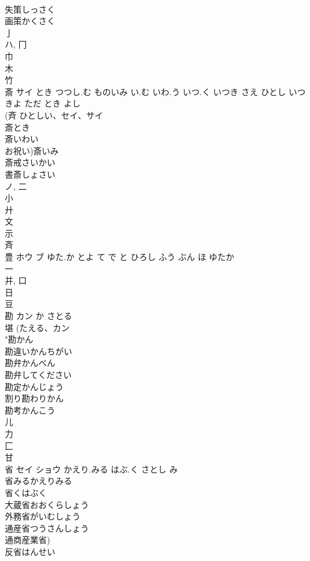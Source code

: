 \documentclass[8pt]{extreport}
\begin{document}
\begin{CJK}{UTF8}{min}
\\	失策しっさく 
\\	画策かくさく 
\\	亅 
\\	ハ, 冂 
\\	巾 
\\	木 
\\	竹 
\\	斎	サイ	とき つつし.む ものいみ い.む いわ.う いつ.く いつき さえ ひとし いつ きよ ただ とき よし	
\\	(斉 ひとしい、セイ、サイ 
\\	斎とき
\\	斎いわい
\\	お祝い)斎いみ
\\	斎戒さいかい
\\	書斎しょさい
\\	ノ, 二 
\\	小 
\\	廾 
\\	文 
\\	示 
\\	斉 
\\	豊	ホウ ブ	ゆた.か とよ て で と ひろし ふう ぶん ほ ゆたか	
\\	一 
\\	并, 口 
\\	日 
\\	豆 
\\	勘	カン	か さとる	
\\	堪 (たえる、カン 
\\	"勘かん
\\	勘違いかんちがい
\\	勘弁かんべん
\\	勘弁してください 
\\	勘定かんじょう
\\	割り勘わりかん
\\	勘考かんこう
\\	儿 
\\	力 
\\	匚 
\\	甘 
\\	省	セイ ショウ	かえり.みる はぶ.く さとし み	
\\	省みるかえりみる
\\	省くはぶく
\\	大蔵省おおくらしょう
\\	外務省がいむしょう
\\	通産省つうさんしょう
\\	通商産業省) 
\\	反省はんせい

\end{CJK}
\end{document}
